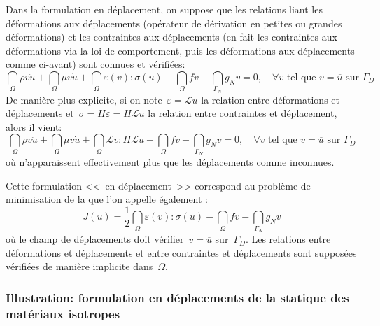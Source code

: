 \medskip
Dans la formulation en déplacement, on suppose que les relations liant les
déformations aux déplacements (opérateur de dérivation en petites ou grandes
déformations) et les contraintes aux déplacements (en fait les contraintes aux
déformations via la loi de comportement, puis les déformations aux déplacements
comme ci-avant) sont connues et vérifiées:
\begin{equation}
\dint_\Omega \rho v\ddot{u} + \dint_\Omega \mu v\dot{u}
+\dint_\Omega \varepsilon(v):\sigma(u) - \dint_\Omega fv
-\dint_{\Gamma_N} g_N v =0, \quad \forall v \text{ tel que } v=\overline{u} \text{ sur } \Gamma_D
\end{equation}
De manière plus explicite, si on note~$\varepsilon=\mathcal{L}u$ la relation entre
déformations et déplacements et~$\sigma = H\varepsilon = H\mathcal{L}u$ la relation entre
contraintes et déplacement, alors il vient:
\begin{equation}
\dint_\Omega \rho v\ddot{u} + \dint_\Omega \mu v\dot{u}
+\dint_\Omega \mathcal{L}v:H\mathcal{L}u - \dint_\Omega fv
-\dint_{\Gamma_N} g_N v =0, \quad \forall v \text{ tel que } v=\overline{u} \text{ sur } \Gamma_D
\end{equation}
où n'apparaissent effectivement plus que les déplacements comme inconnues.


\medskip
Cette formulation <<~en déplacement~>> correspond au problème de minimisation
de la 
que l'on appelle également :
\begin{equation}
J(u)=
\frac12 \dint_\Omega \varepsilon(v):\sigma(u) - \dint_\Omega fv -
\dint_{\Gamma_N} g_N v
\end{equation}
où le champ de déplacements doit vérifier~$v=\overline{u}$ sur~$\Gamma_D$.
Les relations entre déformations et déplacements et entre contraintes et déplacements
sont supposées vérifiées de manière implicite dans~$\Omega$.

\medskip
\subsubsection{Illustration: formulation en déplacements de la statique des matériaux isotropes}

